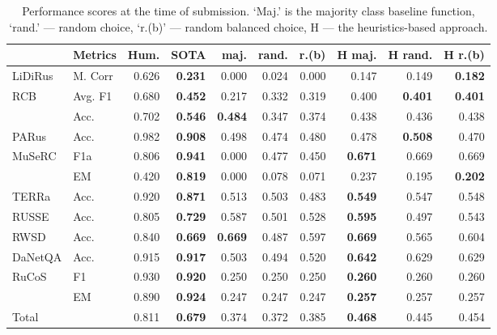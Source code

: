 \documentclass[11pt]{article}
\begin{document}
\begin{table}[htbp]
\centering
\begin{tabular}{|l|l|r|r|r|r|r|r|r|r|}
\hline
&   \textbf{Metrics} &  \textbf {Hum.} & \textbf{SOTA} &  \textbf{maj}. &  \textbf{rand.} &  \textbf{r.(b)}&  \textbf{H maj.} &  \textbf{H rand.} &  \textbf{H r.(b)} \\
\hline
\hline
LiDiRus &  M. Corr &  {0.626} & \textbf{0.231} &     0.000 &   0.024 & 0.000 &  0.147 &  0.149 &  \textbf{0.182} \\
   \hline
RCB &  Avg. F1 & {0.680} & \textbf{0.452} & 0.217 & 0.332 &  0.319 &  0.400 &  \textbf{0.401} &   \textbf{0.401} \\

&  Acc. &  {0.702} & \textbf{0.546} &  \textbf{0.484} &  0.347 & 0.374 & 0.438 & 0.436 & 0.438 \\
       \hline
PARus & Acc. &  {0.982} & \textbf{0.908} &     0.498 &   0.474 &  0.480 & 0.478 & \textbf{0.508} &  0.470 \\
     \hline
MuSeRC & F1a &  {0.806} & \textbf{0.941} & 0.000 & 0.477 & 0.450 &  \textbf{0.671} & 0.669 & 0.669 \\
& EM &  {0.420} & \textbf{0.819} & 0.000 & 0.078 & 0.071  & 0.237 & 0.195 & \textbf{0.202} \\
    \hline
TERRa & Acc. &  {0.920} & \textbf{0.871} & 0.513 & 0.503 & 0.483 &  \textbf{0.549} & 0.547 & 0.548 \\
     \hline
RUSSE &  Acc. &  {0.805} & \textbf{0.729} & 0.587 & 0.501 & 0.528 & \textbf{0.595} & 0.497 & 0.543 \\
     \hline
RWSD &  Acc. &  {0.840} & \textbf{0.669} & \textbf{0.669} &   0.487 & 0.597  & \textbf{0.669} & 0.565 & 0.604 \\
      \hline
DaNetQA & Acc. &  {0.915} & \textbf{0.917} &     0.503 &   0.494 & 0.520  &\textbf{ 0.642} & 0.629 &  0.629 \\
   \hline
RuCoS & F1 & {0.930} & \textbf{0.920} & 0.250 & 0.250 & 0.250 &  \textbf{0.260} & 0.260 &  0.260 \\
 & EM &   {0.890} & \textbf{0.924} & 0.247 &   0.247 & 0.247 &  \textbf{ 0.257} &  0.257 & 0.257 \\
     \hline
Total  &&  {0.811} & \textbf{0.679} & 0.374 &   0.372 &  0.385 &  \textbf{0.468} & 0.445 &  0.454 \\
    \hline

\end{tabular}
\caption{Performance scores at the time of submission. `Maj.' is the majority class baseline function, `rand.' --- random choice, `r.(b)' --- random balanced choice, H --- the heuristics-based approach.}
\label{table: Consoludated_data}
\end{table}
\end{document}
